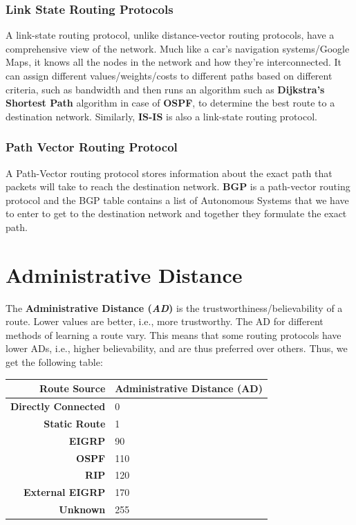 \subsubsection{Link State Routing Protocols}
A link-state routing protocol, unlike distance-vector routing protocols, have a comprehensive view of the network. Much like a car's navigation systems/Google Maps, it knows all the nodes in the network and how they're interconnected. It can assign different values/weights/costs to different paths based on different criteria, such as bandwidth and then runs an algorithm such as \textbf{Dijkstra's Shortest Path} algorithm in case of \textbf{OSPF}, to determine the best route to a destination network. Similarly, \textbf{IS-IS} is also a link-state routing protocol. 

\subsubsection{Path Vector Routing Protocol}
A Path-Vector routing protocol stores information about the exact path that packets will take to reach the destination network. \textbf{BGP} is a path-vector routing protocol and the BGP table contains a list of Autonomous Systems that we have to enter to get to the destination network and together they formulate the exact path.

\section{Administrative Distance}
The \textbf{Administrative Distance (\textit{AD})} is the trustworthiness/believability of a route. Lower values are better, i.e., more trustworthy. The AD for different methods of learning a route vary. This means that some routing protocols have lower ADs, i.e., higher believability, and are thus preferred over others. Thus, we get the following table: 

\vspace{-10pt}
\begin{center}
	\begin{tabular}{rl}
		\toprule
		\textbf{Route Source} &\textbf{Administrative Distance (AD)} \\
		\midrule
		\textbf{Directly Connected} &0\\
		\textbf{Static Route} 	&1\\
		\textbf{EIGRP} 			&90\\
		\textbf{OSPF} 			&110\\
		\textbf{RIP} 			&120\\
		\textbf{External EIGRP}	&170\\
		\textbf{Unknown} 		&255\\
		\bottomrule
	\end{tabular}
\end{center}
\vspace{-5pt}

